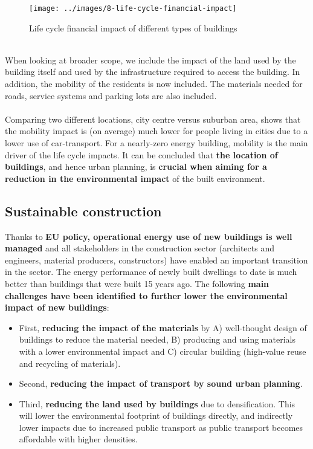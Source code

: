 \documentclass[../summary.tex]{subfiles}
\begin{document}
	
	\begin{figure}[H]
		\centering
		\texttt{[image: ../images/8-life-cycle-financial-impact]}
		\caption{Life cycle financial impact of different types of buildings}
		\label{fig:8-life-cycle-financial-impact}
	\end{figure}
	\ \\
	When looking at broader scope, we include the impact of the land used by the building itself and used by the infrastructure required to access the building. In addition, the mobility of the residents is now included. The materials needed for roads, service systems and parking lots are also included.
	\\\\
	Comparing two different locations, city centre versus suburban area, shows that the mobility impact is (on average) much lower for people living in cities due to a lower use of car-transport. For a nearly-zero energy building, mobility is the main driver of the life cycle impacts. It can be concluded that \textbf{the location of buildings}, and hence urban planning, is \textbf{crucial when aiming for a reduction in the environmental impact} of the built environment.
	
	\subsection{Sustainable construction}
	
	Thanks to \textbf{EU policy, operational energy use of new buildings is well managed} and all stakeholders in the construction sector (architects and engineers, material producers, constructors) have enabled an important transition in the sector. The energy performance of newly built dwellings to date is much better than buildings that were built 15 years ago. The following \textbf{main challenges have been identified to further lower the environmental impact of new buildings}:
	\begin{itemize}
		\item First, \textbf{reducing the impact of the materials} by A) well-thought design of buildings to reduce the material needed, B) producing and using materials with a lower environmental impact and C) circular building (high-value reuse and recycling of materials).
		\item Second, \textbf{reducing the impact of transport by sound urban planning}.
		\item Third, \textbf{reducing the land used by buildings} due to densification. This will lower the environmental footprint of buildings directly, and indirectly lower impacts due to increased public transport as public transport becomes affordable with higher densities.
	\end{itemize}
	
\end{document}
